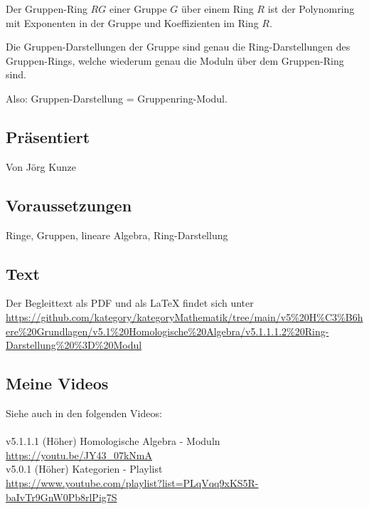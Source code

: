 \documentclass[a4paper]{amsart}
\theoremstyle{definition}
\begin{document}
Der Gruppen-Ring $RG$ einer Gruppe $G$ über einem Ring $R$ ist der Polynomring mit Exponenten in der Gruppe und Koeffizienten im Ring $R$.

Die Gruppen-Darstellungen der Gruppe sind genau die Ring-Darstellungen des Gruppen-Rings, welche wiederum genau die Moduln über dem Gruppen-Ring sind. 

Also: Gruppen-Darstellung = Gruppenring-Modul.

\subsection*{Präsentiert}
Von Jörg Kunze

\subsection*{Voraussetzungen}
Ringe, Gruppen, lineare Algebra, Ring-Darstellung

\subsection*{Text}
Der Begleittext als PDF und als LaTeX findet sich unter
{\tiny
   \url{https://github.com/kategory/kategoryMathematik/tree/main/v5%20H%C3%B6here%20Grundlagen/v5.1%20Homologische%20Algebra/v5.1.1.1.2%20Ring-Darstellung%20%3D%20Modul}
}

\subsection*{Meine Videos}
Siehe auch in den folgenden Videos:\\
\\
v5.1.1.1 (Höher) Homologische Algebra - Moduln\\
\url{https://youtu.be/JY43_07kNmA}
\\
v5.0.1 (Höher) Kategorien - Playlist\\
\url{https://www.youtube.com/playlist?list=PLqVqq9xKS5R-baIvTr9GnW0Pb8rlPig7S}
\end{document}
